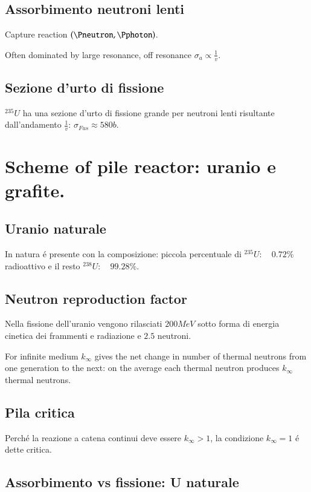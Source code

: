 \subsection{Assorbimento neutroni lenti}
\begin{itemize*}
\item Capture reaction $(\Pneutron,\Pphoton)$.

Often dominated by large resonance, off resonance $\sigma_{a}\propto\frac{1}{v}$.
\end{itemize*}

\subsection{Sezione d'urto di fissione}
$^{235}U$ ha una sezione d'urto di fissione grande per neutroni lenti risultante dall'andamento $\frac{1}{v}$: $\sigma_{Fus}\approx580b$.

\clearpage

\section{Scheme of pile reactor: uranio e grafite.}

\subsection{Uranio naturale}
In natura \'e presente con la composizione: piccola percentuale di $^{235}U:\quad0.72\%$ radioattivo e il resto $^{238}U:\quad99.28\%$. 

\subsection{Neutron reproduction factor}
Nella fissione dell'uranio vengono rilasciati $200 MeV$ sotto forma di energia cinetica dei frammenti e radiazione e $2.5$ neutroni.

For infinite medium $k_{\infty}$ gives the net change in number of thermal neutrons from one generation to the next: on the average each thermal neutron produces $k_{\infty}$ thermal neutrons.

\subsection{Pila critica}
Perch\'e la reazione a catena continui deve essere $k_{\infty}>1$, la condizione $k_{\infty}=1$ \'e dette critica.

\subsection{Assorbimento vs fissione: U naturale}

